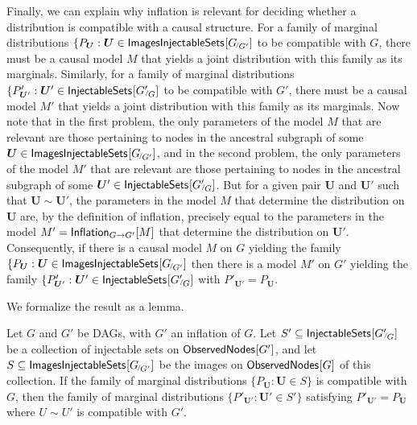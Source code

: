 Finally, we can explain why inflation is relevant for deciding whether a distribution is compatible with a causal structure.  For a family of marginal distributions $\{ P_{\bm{U}} : \bm{U} \in \SmallNamedFunction{ImagesInjectableSets}{{G}_{\!^{/\!}G'}}$ to be compatible with $G$, there must be a causal model $M$ that yields a joint distribution with this family as its marginals.   Similarly, for a family of marginal distributions $\{ P'_{\bm{U}'} : \bm{U}' \in \SmallNamedFunction{InjectableSets}{{G'}_{\!\!^{/\!}G}}$ to be compatible with $G'$, there must be a causal model $M'$ that yields a joint distribution with this family as its marginals.  Now note that in the first problem, the only parameters of the model $M$ that are relevant are those pertaining to nodes in the ancestral subgraph of some $\bm{U}\in \SmallNamedFunction{ImagesInjectableSets}{{G}_{\!^{/\!}G'}}$, and in the second problem, the only parameters of the model $M'$ that are relevant are those pertaining to nodes in the ancestral subgraph of some $\bm{U}' \in \SmallNamedFunction{InjectableSets}{{G'}_{\!\!^{/\!}G}}$.  But for a given pair $\bm{U}$ and $\bm{U}'$ such that  $\bm{U} \sim \bm{U}'$, the parameters in the model $M$ that determine the distribution on  $\bm{U}$ are, by the definition of inflation, precisely equal to the parameters in the model $M' = \SmallNamedFunction[G\to G']{Inflation}{M}$ that determine the distribution on $\bm{U}'$.  
Consequently, if there is a causal model $M$ on $G$ yielding the family $\{ P_{\bm{U}} : \bm{U} \in \SmallNamedFunction{ImagesInjectableSets}{{G}_{\!^{/\!}G'}}$ then there is a model $M'$ on $G'$ yielding the family $\{ P'_{\bm{U}'} : \bm{U}' \in \SmallNamedFunction{InjectableSets}{{G'}_{\!\!^{/\!}G}}$ with $P'_{\bm{U}'}= P_{\bm{U}}$.  

We formalize the result as a lemma. 
\begin{lemma} \label{mainlemma}
Let $G$ and $G'$ be DAGs, with $G'$ an inflation of $G$. 
Let $S'  \subseteq \SmallNamedFunction{InjectableSets}{{G'}_{\!\!^{/\!}G}}$ be a collection of injectable sets on $\SmallNamedFunction{ObservedNodes}{G'}$, and let $S \subseteq \SmallNamedFunction{ImagesInjectableSets}{{G}_{\!^{/\!}G'}}$ be the images on $\SmallNamedFunction{ObservedNodes}{G}$ of this collection.   If the family of marginal distributions $\{ P_{\bm{U}} : \bm{U} \in S \}$ is compatible with $G$, then the family of marginal distributions $\{ P'_{\bm{U}'} : \bm{U}' \in S' \}$ satisfying $P'_{\bm{U}'}= P_{\bm{U}}$ where $U \sim U'$ is compatible with $G'$.
\end{lemma}

